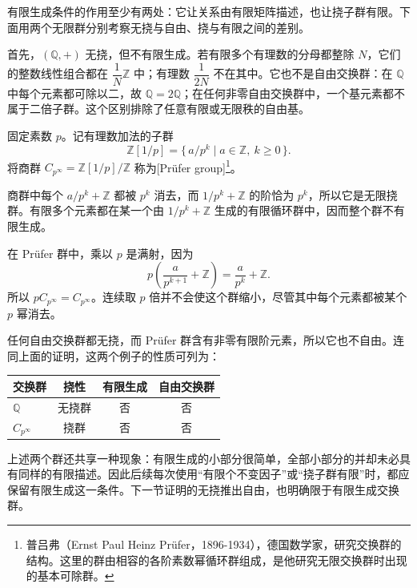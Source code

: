 有限生成条件的作用至少有两处：它让关系由有限矩阵描述，也让挠子群有限。下面用两个无限群分别考察无挠与自由、挠与有限之间的差别。

\ProseParagraphBreak
首先，\((\mathbb Q,+)\) 无挠，但不有限生成。若有限多个有理数的分母都整除 \(N\)，它们的整数线性组合都在 \(\dfrac1N\mathbb Z\) 中；有理数 \(\dfrac1{2N}\) 不在其中。它也不是自由交换群：在 \(\mathbb Q\) 中每个元素都可除以二，故 \(\mathbb Q=2\mathbb Q\)；在任何非零自由交换群中，一个基元素都不属于二倍子群。这个区别排除了任意有限或无限秩的自由基。

\begin{definition}[Prüfer 群]\label{b1:def:prufer-group}
	固定素数 \(p\)。记有理数加法的子群
	\[
		\mathbb Z[1/p]=\{\,a/p^k\mid a\in\mathbb Z,\ k\ge0\,\}.
	\]
	将商群 \(C_{p^\infty}=\mathbb Z[1/p]/\mathbb Z\) 称为[Prüfer group]\footnote{普吕弗（Ernst Paul Heinz Prüfer，1896-1934），德国数学家，研究交换群的结构。这里的群由相容的各阶素数幂循环群组成，是他研究无限交换群时出现的基本可除群。}。
\end{definition}

商群中每个 \(a/p^k+\mathbb Z\) 都被 \(p^k\) 消去，而 \(1/p^k+\mathbb Z\) 的阶恰为 \(p^k\)，所以它是无限挠群。有限多个元素都在某一个由 \(1/p^k+\mathbb Z\) 生成的有限循环群中，因而整个群不有限生成。

\ProseParagraphBreak
在 Prüfer 群中，乘以 \(p\) 是满射，因为
\[
	p\left(\frac{a}{p^{k+1}}+\mathbb Z\right) =\frac{a}{p^k}+\mathbb Z.
\]
所以 \(pC_{p^\infty}=C_{p^\infty}\)。连续取 \(p\) 倍并不会使这个群缩小，尽管其中每个元素都被某个 \(p\) 幂消去。

\ProseParagraphBreak
任何自由交换群都无挠，而 Prüfer 群含有非零有限阶元素，所以它也不自由。连同上面的证明，这两个例子的性质可列为：

\begin{center}
	\begin{tabular}{@{}lccc@{}}
		\toprule
		交换群 & 挠性 & 有限生成 & 自由交换群 \\
		\midrule
		\(\mathbb Q\) & 无挠群 & 否 & 否 \\
		\(C_{p^\infty}\) & 挠群 & 否 & 否 \\
		\bottomrule
	\end{tabular}
\end{center}

上述两个群还共享一种现象：有限生成的小部分很简单，全部小部分的并却未必具有同样的有限描述。因此后续每次使用“有限个不变因子”或“挠子群有限”时，都应保留有限生成这一条件。下一节证明的无挠推出自由，也明确限于有限生成交换群。
